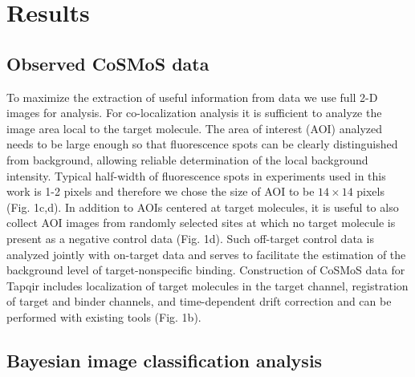 \section*{Results}

\subsection*{Observed CoSMoS data} %

To maximize the extraction of useful information from data we use full 2-D images for analysis. For co-localization analysis it is sufficient to analyze the image area local to the target molecule. The area of interest (AOI) analyzed needs to be large enough so that fluorescence spots can be clearly distinguished from background, allowing  reliable  determination of the  local  background  intensity. Typical half-width of fluorescence spots in experiments used in this work is 1-2 pixels and therefore we chose the size of AOI to be $14\times14$ pixels (Fig. 1c,d). In addition to AOIs centered at target molecules, it is useful to also collect AOI images from randomly selected sites at which no target molecule is present as a negative control data (Fig. 1d). Such off-target control data is analyzed jointly with on-target data and serves to facilitate the estimation of the background level of target-nonspecific binding. Construction of CoSMoS data for Tapqir includes localization of target molecules in the target channel, registration of target and binder channels, and time-dependent drift correction and can be performed with existing tools \cite{Friedman2015-nx, Smith2019-yb} (Fig. 1b).


\subsection*{Bayesian image classification analysis}

